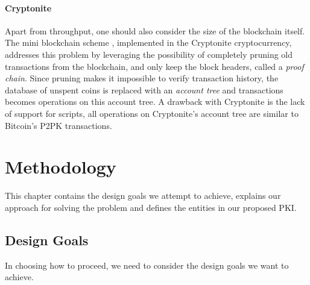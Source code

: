 \documentclass{style/kththesis}
\begin{document}
\subsubsection{Cryptonite}
Apart from throughput, one should also consider the size of the blockchain itself. The mini blockchain scheme \cite{Bruce14}, implemented in the Cryptonite cryptocurrency, addresses this problem by leveraging the possibility of completely pruning old transactions from the blockchain, and only keep the block headers, called a \textit{proof chain}. Since pruning makes it impossible to verify transaction history, the database of unspent coins is replaced with an \emph{account tree} and transactions becomes operations on this account tree. A drawback with Cryptonite is the lack of support for scripts, all operations on Cryptonite's account tree are similar to Bitcoin's P2PK transactions.

\chapter{Methodology}
\label{chap:method}
This chapter contains the design goals we attempt to achieve, explains our approach for solving the problem and defines the entities in our proposed PKI.

\section{Design Goals}
In choosing how to proceed, we need to consider the design goals we want to achieve.
\end{document}
